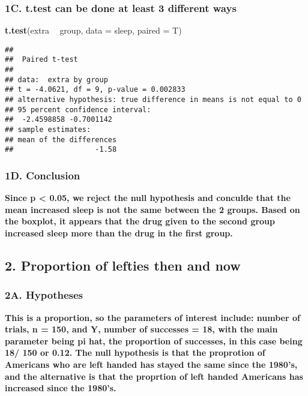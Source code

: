 \documentclass[]{article}
\newenvironment{Shaded}{\begin{snugshade}}{\end{snugshade}}
\newcommand{\DataTypeTok}[1]{\textcolor[rgb]{0.13,0.29,0.53}{#1}}
\newcommand{\KeywordTok}[1]{\textcolor[rgb]{0.13,0.29,0.53}{\textbf{#1}}}
\newcommand{\NormalTok}[1]{#1}
\newcommand{\OperatorTok}[1]{\textcolor[rgb]{0.81,0.36,0.00}{\textbf{#1}}}
\newcommand{\StringTok}[1]{\textcolor[rgb]{0.31,0.60,0.02}{#1}}
\begin{document}
\hypertarget{c.-t.test-can-be-done-at-least-3-different-ways}{%
\subsubsection{1C. t.test can be done at least 3 different
ways}\label{c.-t.test-can-be-done-at-least-3-different-ways}}

\begin{Shaded}
\begin{Highlighting}[]
\KeywordTok{t.test}\NormalTok{(extra }\OperatorTok{~}\StringTok{ }\NormalTok{group, }\DataTypeTok{data =}\NormalTok{ sleep, }\DataTypeTok{paired =}\NormalTok{ T)}
\end{Highlighting}
\end{Shaded}

\begin{verbatim}
## 
##  Paired t-test
## 
## data:  extra by group
## t = -4.0621, df = 9, p-value = 0.002833
## alternative hypothesis: true difference in means is not equal to 0
## 95 percent confidence interval:
##  -2.4598858 -0.7001142
## sample estimates:
## mean of the differences 
##                   -1.58
\end{verbatim}

\hypertarget{d.-conclusion}{%
\subsubsection{1D. Conclusion}\label{d.-conclusion}}

\textbf{Since p \textless{} 0.05, we reject the null hypothesis and
conculde that the mean increased sleep is not the same between the 2
groups. Based on the boxplot, it appears that the drug given to the
second group increased sleep more than the drug in the first group.}

\hypertarget{proportion-of-lefties-then-and-now}{%
\subsection{2. Proportion of lefties then and
now}\label{proportion-of-lefties-then-and-now}}

\hypertarget{a.-hypotheses-1}{%
\subsubsection{2A. Hypotheses}\label{a.-hypotheses-1}}

\textbf{This is a proportion, so the parameters of interest include:
number of trials, n = 150, and Y, number of successes = 18, with the
main parameter being pi hat, the proportion of successes, in this case
being 18/ 150 or 0.12. The null hypothesis is that the proprotion of
Americans who are left handed has stayed the same since the 1980's, and
the alternative is that the proprtion of left handed Americans has
increased since the 1980's.}
\end{document}
